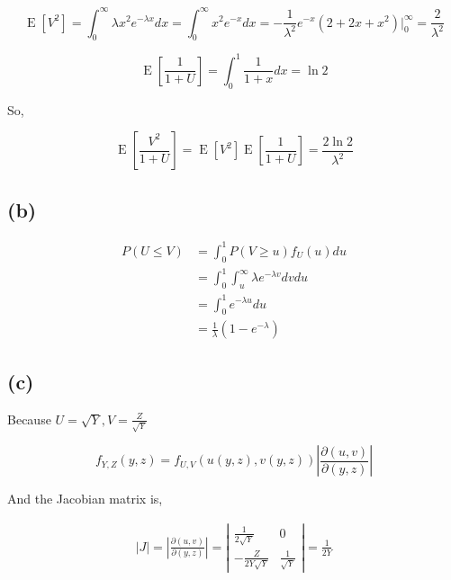 \documentclass{article}
\begin{document}
\begin{equation}
    \operatorname{E}[V^2]  = \int_{0}^{\infty} \lambda x^2 e^{-\lambda x} dx = \int_{0}^{\infty} x^2 e^{- x} dx = -\frac{1}{\lambda^2} e^{-x} (2 + 2 x + x^2) \big|_{0}^{\infty} = \frac{2}{\lambda^2}
\end{equation}

\begin{equation}
    \operatorname{E}\left[\frac{1}{1+U}\right] = \int_{0}^{1} \frac {1}{1+x} dx = \ln 2
\end{equation}

So,

\begin{equation}
    \operatorname{E}\left[\frac{V^2}{1+U}\right]= \operatorname{E}[V^2] \operatorname{E}\left[\frac{1}{1+U}\right] = \frac{2\ln 2}{\lambda^2}
\end{equation}

\subsection{(b)}

\begin{equation}
    \begin{aligned}
        P(U\leqslant V) & = \int_{0}^1 P(V\geqslant u) f_U(u)du \\
        & = \int_{0}^1 \int_{u}^{\infty} \lambda  e^{-\lambda v} dv du \\
        & =  \int_{0}^1 e^{-\lambda u}du \\
        & =  \frac 1 {\lambda} (1-e^{-\lambda})
    \end{aligned}
\end{equation}

\subsection{(c)}

Because $U =\sqrt{Y}, V = \frac{Z}{\sqrt{Y}}$ 

\begin{equation}
    f_{Y,Z}(y, z)=f_{U,V}(u(y,z), v(y,z))\left|\frac{\partial(u,v)}{\partial(y,z)}\right|
\end{equation}

And the Jacobian matrix is,

\begin{equation}
    \begin{aligned}
        \left|J\right| = \left|\frac{\partial(u,v)}{\partial(y,z)}\right| = \left|\begin{matrix}
            \frac{1}{2\sqrt{Y}}&0\\-\frac{Z}{2Y\sqrt{Y}}&\frac{1}{\sqrt{Y}} 
        \end{matrix}\right| = \frac{1}{2Y}
    \end{aligned}
\end{equation}
\end{document}
